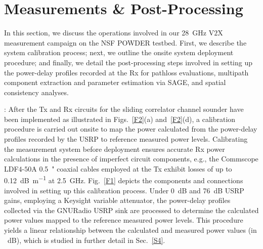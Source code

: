 \documentclass[10pt, twocolumn]{IEEEtran}
\begin{document}
\section{Measurements \& Post-Processing}\label{S3}
In this section, we discuss the operations involved in our \SI{28}{\giga\hertz} V$2$X measurement campaign on the NSF POWDER testbed. First, we describe the system calibration process; next, we outline the onsite system deployment procedure; and finally, we detail the post-processing steps involved in setting up the power-delay profiles recorded at the Rx for pathloss evaluations, multipath component extraction and parameter estimation via SAGE, and spatial consistency analyses.

: After the Tx and Rx circuits for the sliding correlator channel sounder have been implemented as illustrated in Figs.~\ref{F2}(a) and~\ref{F2}(d), a calibration procedure is carried out onsite to map the power calculated from the power-delay profiles recorded by the USRP to reference measured power levels. Calibrating the measurement system before deployment ensures accurate Rx power calculations in the presence of imperfect circuit components, e.g., the Commscope LDF$4$-$50$A \SI{0.5}{{"}} coaxial cables employed at the Tx exhibit losses of up to \SI{0.12}{\deci\bel\per\meter} at \SI{2.5}{\giga\hertz}. Fig.~\ref{F1} depicts the components and connections involved in setting up this calibration process. Under \SI{0}{\deci\bel} and \SI{76}{\deci\bel} USRP gains, employing a Keysight variable attenuator, the power-delay profiles collected via the GNURadio USRP sink are processed to determine the calculated power values mapped to the reference measured power levels. This procedure yields a linear relationship between the calculated and measured power values (in \SI{}{\deci\bel}), which is studied in further detail in Sec.~\ref{S4}.
\end{document}
